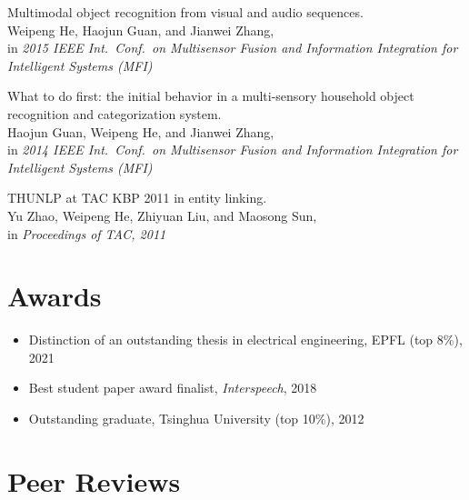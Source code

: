 \documentclass[a4paper,9pt]{extarticle} %
\begin{document}
\begin{enumerate}[label={[\arabic*]}]
  \item Multimodal object recognition from visual and audio sequences. \\
        Weipeng He, Haojun Guan, and Jianwei Zhang, \\
        in \textit{2015 IEEE Int.\ Conf.\ on Multisensor Fusion and Information Integration for Intelligent Systems (MFI)}

  \item What to do first: the initial behavior in a multi-sensory household object recognition and categorization system. \\
        Haojun Guan, Weipeng He, and Jianwei Zhang, \\
        in \textit{2014 IEEE Int.\ Conf.\ on Multisensor Fusion and Information Integration for Intelligent Systems (MFI)}

  \item THUNLP at TAC KBP 2011 in entity linking. \\
        Yu Zhao, Weipeng He, Zhiyuan Liu, and Maosong Sun, \\
        in \textit{Proceedings of TAC, 2011}
\end{enumerate}


\section{Awards}

\begin{itemize}[itemsep=-.9em]
  \item Distinction of an outstanding thesis in electrical engineering, EPFL (top 8\%), 2021
  \item Best student paper award finalist, \textit{Interspeech}, 2018
  \item Outstanding graduate, Tsinghua University (top 10\%), 2012
\end{itemize}


\section{Peer Reviews}
\end{document}
